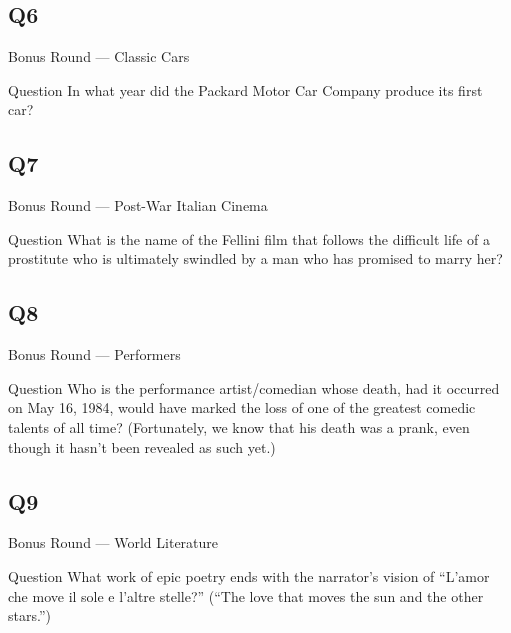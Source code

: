 \documentclass[11pt]{beamer}
\begin{document}
\subsection*{Q6}
\begin{frame}[t]{Bonus Round --- Classic Cars }
\vspace{-0.5em}
\begin{block}{Question}
In what year did the Packard Motor Car Company produce its first car?
\end{block}
\end{frame}
\subsection*{Q7}
\begin{frame}[t]{Bonus Round --- Post-War Italian Cinema}
\vspace{-0.5em}
\begin{block}{Question}
What is the name of the Fellini film that follows the difficult life of a prostitute who is ultimately swindled by a man who has promised to marry her?
\end{block}
\end{frame}
\subsection*{Q8}
\begin{frame}[t]{Bonus Round --- Performers}
\vspace{-0.5em}
\begin{block}{Question}
Who is the performance artist/comedian whose death, had it occurred on May 16, 1984, would have marked the loss of one of the greatest comedic talents of all time? (Fortunately, we know that his death was a prank, even though it hasn't been revealed as such yet.)
\end{block}
\end{frame}
\subsection*{Q9}
\begin{frame}[t]{Bonus Round --- World Literature}
\vspace{-0.5em}
\begin{block}{Question}
What work of epic poetry ends with the narrator's vision of ``L'amor che move il sole e l'altre stelle?'' (``The love that moves the sun and the other stars.'')
\end{block}
\end{frame}
\end{document}
